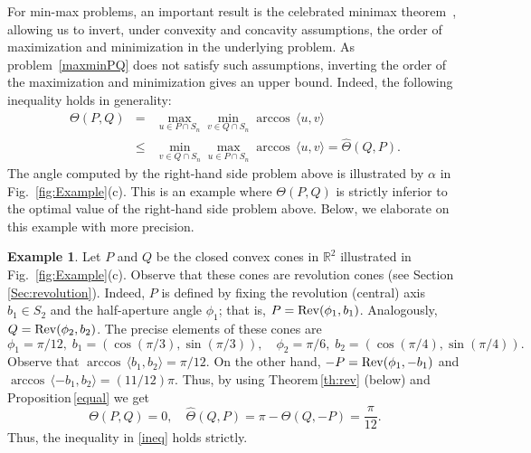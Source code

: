 \documentclass[hidelinks,onefignum,onetabnum]{siamart250211}
\theoremstyle{definition}
\newtheorem{example}{Example}
\theoremstyle{remark}
\newcommand{\R}{\mathbb R}
\newcommand{\inner}[2]{\langle#1,#2\rangle}
\begin{document}
For min-max problems, an important result is the celebrated minimax theorem~\cite{Simons95}, allowing us to invert, under convexity and concavity assumptions, the order of maximization and minimization in the underlying problem. As problem~\eqref{maxminPQ} does not satisfy such assumptions, inverting the order of the maximization and minimization gives an upper bound. Indeed, the following inequality holds in generality:
\begin{equation}\label{ineq}
\begin{array}{lcl}
\Theta(P,Q)&=&\displaystyle \max_{u\in P\cap S_n}\min_{v\in Q\cap S_n}\arccos\,\inner{u}{v}\\
 &\leq& 
\displaystyle \min_{v\in Q\cap S_n}\max_{u\in P\cap S_n}\arccos\,\inner{u}{v}=\widehat\Theta(Q,P).
\end{array}
\end{equation}
The angle computed by the right-hand side problem above is illustrated by $\alpha$ in Fig.~\ref{fig:Example}(c). This is an example where $\Theta(P,Q)$ is strictly inferior to the optimal value of the right-hand side problem above. Below, we elaborate on this example with more precision. 

\begin{example}\label{ex:strict}
Let $P$ and $Q$ be the closed convex cones in $\R^2$ illustrated in Fig.~\ref{fig:Example}(c). Observe that these cones are revolution cones (see Section\,\ref{Sec:revolution}). Indeed, $P$ is defined by fixing the revolution (central) axis $b_1\in S_2$ and the half-aperture angle $\phi_1$; that is, $P={\rm Rev}(\phi_1,b_1)$. Analogously, $Q={\rm Rev}(\phi_2,b_2)$. The precise elements of these cones are
\[\phi_1=\pi/12,\;b_1=(\cos(\pi/3),\sin(\pi/3)),\quad \phi_2=\pi/6,\;b_2=(\cos(\pi/4),\sin(\pi/4)).\]
Observe that $\arccos\,\langle b_1,b_2\rangle=\pi/12$. On the other hand, $-P={\rm Rev}(\phi_1,-b_1)$ and $\arccos\,\langle -b_1,b_2\rangle=(11/12)\pi$. Thus, by using Theorem\,\ref{th:rev} (below) and Proposition\,\ref{equal} we get
\[\Theta(P,Q)=0,\quad\widehat\Theta(Q,P)=\pi-\Theta(Q,-P)=\frac{\pi}{12}.\]
Thus, the inequality in \eqref{ineq} holds strictly.
\end{example}
\end{document}
